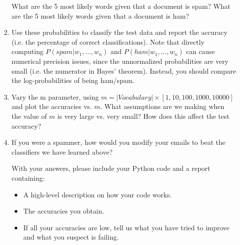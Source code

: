 \documentclass[11pt]{article}
\begin{document}
\begin{enumerate}
\begin{enumerate}
What are the 5 most likely words given that a document is spam? What are the 5 most likely words given that a document is ham?

\item  Use these probabilities to classify the test data and report the accuracy (i.e. the percentage of correct classifications). Note that directly computing $P(spam|w_1,\ldots,w_n)$ and $P(ham|w_1,...,w_n)$ can cause numerical precision issues, since the unnormalized probabilities are very small (i.e. the numerator in Bayes’ theorem). Instead, you should compare the log-probabilities of being ham/spam.
\item Vary the m parameter, using $m = |Vocabulary| \times [1, 10, 100, 1000, 10000]$ and plot the accuracies vs. $m$. What assumptions are we making when the value of $m$ is very large vs. very small? How does this affect the test accuracy?
\item  If you were a spammer, how would you modify your emails to beat the classifiers we have learned above?

With your answers, please include your Python code and a report containing: 
\begin{itemize}
\item A high-level description on how your code works.
\item The accuracies you obtain.
\item If all your accuracies are low, tell us what you have tried to improve and what you suspect is failing.
\end{itemize}

\end{enumerate}
\end{enumerate}
\end{document}
